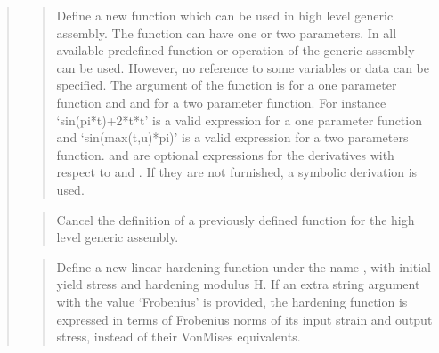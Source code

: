 \documentclass[a4paper,11pt,english]{sphinxmanual}
\begin{document}
\begin{quote}
\begin{quote}
\sphinxAtStartPar
Define a new function  which can be used in high level
generic assembly. The function can have one or two parameters.
In  all available predefined function or operation
of the generic assembly can be used. However, no reference to
some variables or data can be specified. The argument of the
function is  for a one parameter function and  and 
for a two parameter function. For instance ‘sin(pi*t)+2*t*t’
is a valid expression for a one parameter function and
‘sin(max(t,u)*pi)’ is a valid expression for a two parameters
function.  and 
are optional expressions for the derivatives with respect
to  and . If they are not furnished, a symbolic derivation
is used.
\end{quote}

\sphinxAtStartPar
{}
\begin{quote}

\sphinxAtStartPar
Cancel the definition of a previously defined function 
for the high level generic assembly.
\end{quote}

\sphinxAtStartPar
{}
\begin{quote}

\sphinxAtStartPar
Define a new linear hardening function under the name , with
initial yield stress  and hardening modulus H.
If an extra string argument with the value ‘Frobenius’ is provided,
the hardening function is expressed in terms of Frobenius norms of its
input strain and output stress, instead of their Von\sphinxhyphen{}Mises equivalents.
\end{quote}

\sphinxAtStartPar
{}
\begin{quote}


\end{quote}
\end{quote}
\end{document}
